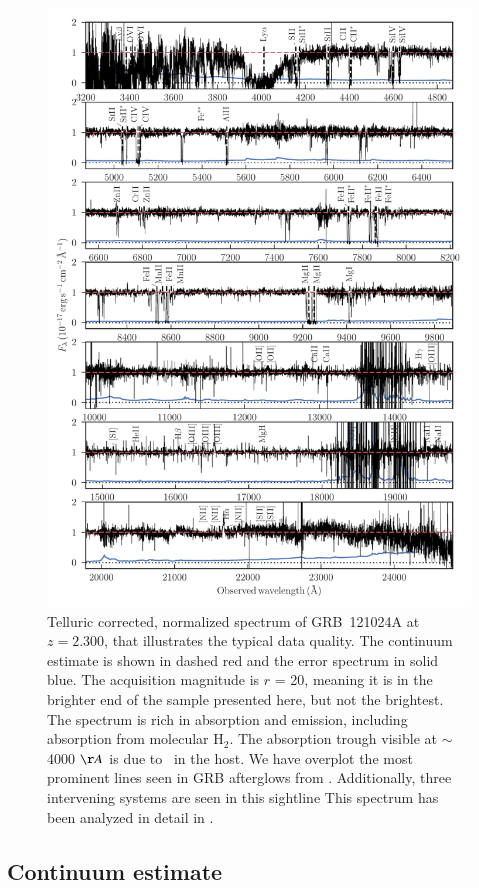 \documentclass{aa}    %
\begin{document}
\begin{figure}
	\centerline{\includegraphics[width=0.85\linewidth]{figures/GRB121024A.pdf}}
\caption{Telluric corrected, normalized spectrum of GRB~121024A at $z = 2.300$,
	that illustrates the typical data quality. The continuum estimate is shown in
	dashed red and the error spectrum in solid blue. The acquisition magnitude is
	$r$ = 20, meaning it is in the brighter end of the sample presented here, but
	not the brightest. The spectrum is rich in absorption and emission, including
	absorption from molecular $\mathrm{H_2}$. The absorption trough visible at
	$\sim$ 4000 $\AA$ is due to \lya~in the host. We have overplot the most
	prominent lines seen in GRB afterglows from \citet{Christensen2011a}.
	Additionally, three intervening systems are seen in this sightline This
	spectrum has been analyzed in detail in \citet{Friis2015}.}
\label{fig:spectrum}
\end{figure}



\subsection{Continuum estimate} \label{continuum}
\end{document}
